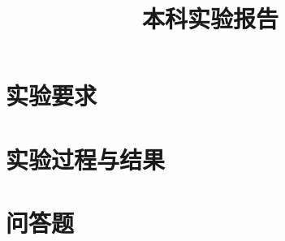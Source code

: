 \documentclass{sysureport}
\title{本科实验报告}
\date{\zhtoday}
\begin{document}
\makecover


\section{实验要求}
    
\section{实验过程与结果}
    
\section{问答题}
    
\end{document}
